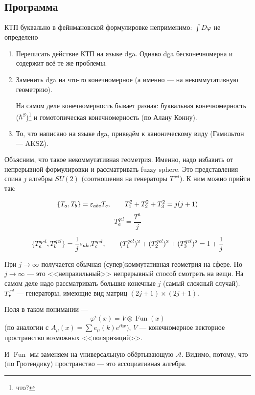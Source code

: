 \documentclass[11pt]{article}
\def\ph{\varphi}
\theoremstyle{remark}
\theoremstyle{definition}
\newcommand{\que}[1]{\footnote{\textcolor[rgb]{0.38,0.69,0.82}{#1}}}
\begin{document}
\subsection{Программа}

КТП буквально в фейнмановской формулировке неприменимо: $\int D\ph$ не определено

\begin{enumerate}

\item Переписать действие КТП на языке dga. Однако dga бесконечномерна и содержит всё те же проблемы.
\item Заменить dga на что-то конечномерное (а именно --- на некоммутативную геометрию).

На самом деле конечномерность бывает разная: буквальная конечномерность ($\hbar^S$)\que{что?} и гомотопическая конечномерность (по Алану Конну).

\item То, что написано на языке dga, приведём к каноническому виду (Гамильтон --- AKSZ).

\end{enumerate}

Объясним, что такое некоммутативная геометрия. Именно, надо избавить от непрерывной формулировки и рассматривать fuzzy sphere. Это представления спина $j$ алгебры $SU(2)$ (соотношения на генераторы $T^{qcl}$). К ним можно прийти так:

$$\{T_a, T_b\} = \varepsilon_{abc} T_c, \hskip 20 pt T_1^2 + T_2^2 + T_3^2 = j(j+1)$$
$$T_a^{qcl} = \frac{T^a}{j}$$

$$\{ T^{qcl}_a, T^{qcl}_b \} = \frac{1}{j} \varepsilon_{abc} T_c^{qcl}, \hskip 20 pt (T_1^{qcl})^2 + (T_2^{qcl})^2 + (T_3^{qcl})^2 = 1 + \frac{1}{j}$$

При $j \to \infty$ получается обычная (супер)коммутативная геометрия на сфере. Но $j \to \infty$ --- это <<неправильный>> непрерывный способ смотреть на вещи. На самом деле надо рассматривать большие конечные $j$ (самый сложный случай). $T^{qcl}_{\bullet}$ --- генераторы, имеющие вид матриц $(2j+1) \times (2j+1)$.

Поля в таком понимании --- $$\ph^i (x) = V \otimes \operatorname{Fun}(x)$$ (по аналогии с $A_{\mu} (x) = \sum e_{\mu} (k) e^{ikx}$), $V$ --- конечномерное векторное пространство возможных <<поляризаций>>.

И $\operatorname{Fun}$ мы заменяем на универсальную обёртывающую $\mathcal{A}$. Видимо, потому, что (по Гротендику) пространство --- это ассоциативная алгебра.
\end{document}
